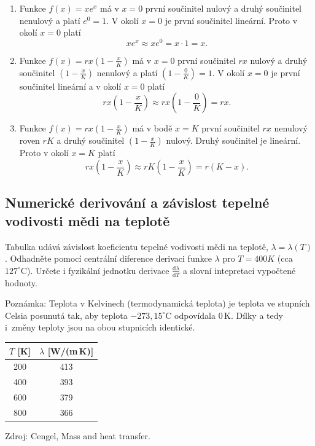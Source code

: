 \reseni

\begin{enumerate}
\item Funkce $f(x)=xe^x$ má v $x=0$ první součinitel nulový a druhý součinitel nenulový a platí $e^0=1$. V okolí $x=0$ je první součinitel
  lineární.  Proto v okolí
  $x=0$ platí
  $$xe^x\approx xe^0=x\cdot 1=x.$$
\item Funkce $f(x)=rx\left(1-\frac xK\right)$ má v $x=0$ první
součinitel $rx$ nulový a  
druhý součinitel $\left(1-\frac xK\right)$ nenulový a platí
$\left(1-\frac 0K\right)=1$. V okolí $x=0$ je první součinitel lineární a v okolí $x=0$ platí
  $$rx\left(1-\frac xK\right)\approx rx\left(1-\frac 0K\right)=rx.$$
\item Funkce $f(x)=rx\left(1-\frac xK\right)$ má v bodě $x=K$ první součinitel $rx$ nenulový roven $rK$ a
   druhý součinitel $\left(1-\frac xK\right)$ nulový. Druhý součinitel je lineární. Proto v okolí
  $x=K$ platí
  $$rx\left(1-\frac xK\right)\approx rK\left(1-\frac xK\right)=r(K-x).$$
\end{enumerate}

\konec

\stranka


\subsection{Numerické derivování a závislost tepelné vodivosti mědi na teplotě}


Tabulka udává závislost koeficientu tepelné vodivosti mědi na teplotě, $\lambda=\lambda(T)$. Odhadněte pomocí centrální diference derivaci funkce $\lambda$ pro $T=400K$ (cca $127^\circ \mathrm C$). Určete i fyzikální jednotku derivace $\frac{\mathrm d\lambda}{\mathrm dT}$ a slovní intepretaci vypočtené hodnoty.

{\footnotesize Poznámka: Teplota v Kelvinech (termodynamická teplota) je teplota ve stupních Celsia posunutá tak, aby teplota $-273{,}15^\circ\mathrm C$ odpovídala $0\,\mathrm K$. Dílky a tedy i~změny teploty jsou na obou stupnicích identické.

  }

{\centering 
\begin{tabular}{cc}
  $T$ [K] & $\lambda$ [W/(m\,K)]\\
  \hline
  200 & 413 \\
  400 & 393 \\
  600 & 379 \\
  800 & 366 \\
\end{tabular}

{\footnotesize Zdroj: Cengel, Mass and heat transfer.}

}
\reseni

